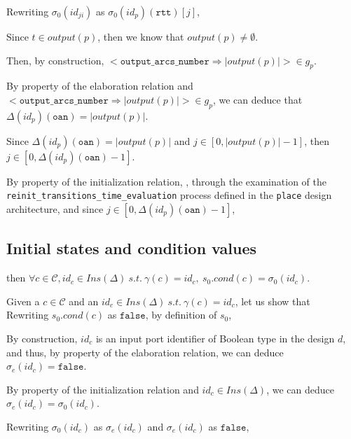 \documentclass[dvipsnames,12pt]{article}
\begin{document}
\begin{niproof}
\begin{itemize}
    Rewriting $\sigma_0(id_{ji})$ as
    $\sigma_0(id_p)(\texttt{rtt})[j]$,

    Since $t\in{}output(p)$, then we know that
    $output(p)\neq\emptyset$.

    Then, by construction,
    ${<}\mathtt{output\_arcs\_number\Rightarrow}\vert{}output(p)\vert{>}\in{}g_p$.

    By property of the elaboration relation and
    ${<}\mathtt{output\_arcs\_number}\Rightarrow\vert{}output(p)\vert{>}\in{}g_p$,
    we can deduce that $\Delta(id_p)(\texttt{oan})=\vert{}output(p)\vert$.

    Since $\Delta(id_p)(\texttt{oan})=\vert{}output(p)\vert$ and
    $j\in[0,\vert{}output(p)\vert-1]$, then
    $j\in[0,\Delta(id_p)(\texttt{oan})-1]$.
    
    By property of the \hvhdl{} initialization relation, \InCsCompP,
    through the examination of the
    \texttt{reinit\_transitions\_time\_evaluation} process defined in
    the \texttt{place} design architecture, and since
    $j\in[0,\Delta(id_p)(\texttt{oan})-1]$,

  \end{itemize}
  
\end{niproof}

\subsection{Initial states and condition values}
\label{sec:init-states-cond-vals}

\begin{lemma}
  \label{lem:init-states-cond-vals}
  \inithyps{} 
  then
  $\forall{}c\in\mathcal{C},id_c\in{}Ins(\Delta)~s.t.~\gamma(c)=id_c,~s_0.cond(c)=\sigma_0(id_c)$.
\end{lemma}

\begin{niproof}
  Given a $c\in\mathcal{C}$ and an
  $id_c\in{}Ins(\Delta)~s.t.~\gamma(c)=id_c$, let us show that
  \\

  Rewriting $s_0.cond(c)$ as $\mathtt{false}$, by definition of $s_0$,

  By construction, $id_c$ is an input port identifier of Boolean type
  in the \hvhdl{} design $d$, and thus, by property of the \hvhdl{}
  elaboration relation, we can deduce $\sigma_e(id_c)=\mathtt{false}$.

  By property of the \hvhdl{} initialization relation and
  $id_c\in{}Ins(\Delta)$, we can deduce
  $\sigma_e(id_c)=\sigma_0(id_c)$.

  Rewriting $\sigma_0(id_c)$ as $\sigma_e(id_c)$ and $\sigma_e(id_c)$
  as $\mathtt{false}$, 
  
\end{niproof}
\end{document}
